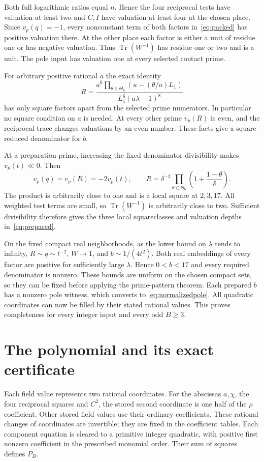 \documentclass[11pt,a4paper]{article}
\DeclareMathOperator{\Tr}{Tr}\DeclareMathOperator{\Nm}{N}
\begin{document}
Both full logarithmic ratios equal $n$. Hence the four reciprocal
tests have valuation at least two and $C,I$ have valuation at least
four at the chosen place. Since $v_p(q)=-1$, every nonconstant term
of both factors in~\eqref{eq:packed} has positive valuation there.
At the other place each factor is either a unit of residue one or has
negative valuation. Thus $\Tr(W^{-1})$ has residue one or two and is
a unit. The pole input has valuation one at every selected contact prime.

For arbitrary positive rational $a$ the exact identity
\begin{equation}\label{eq:primeproduct}
 R=\frac{a^6\prod_{\theta\in\Theta_6}(u-(\theta/a)L_1)}
             {L_1^6(a\lambda-1)^8}
\end{equation}
has only square factors apart from the selected prime numerators.
In particular no square condition on $a$ is needed. At every other
prime $v_p(R)$ is even, and the reciprocal trace changes valuations
by an even number. These facts give a square reduced denominator for $b$.

At a preparation prime, increasing the fixed denominator divisibility
makes $v_p(t)\ll0$. Then
\[
 v_p(q)=v_p(R)=-2v_p(t),\qquad
 R=\delta^{-2}\prod_{\theta\in\Theta_6}
                   \left(1+\frac{1-\theta}{\delta}\right).
\]
The product is arbitrarily close to one and is a local square at
$2,3,17$. All weighted test terms are small, so $\Tr(W^{-1})$ is
arbitrarily close to two. Sufficient divisibility therefore gives the
three local squareclasses and valuation depths in~\eqref{eq:prepared}.

On the fixed compact real neighborhoods, as the lower bound on $\lambda$
tends to infinity, $R\sim q\sim t^{-2}$, $W\to1$, and
$b\sim1/(4t^2)$. Both real embeddings of every factor are positive
for sufficiently large $\lambda$. Hence $0<b<17$ and every required
denominator is nonzero. These bounds are uniform on the chosen compact
sets, so they can be fixed before applying the prime-pattern theorem.
Each prepared $b$ has a nonzero pole witness, which converts to
\eqref{eq:normalizedpole}. All quadratic coordinates can now be filled
by their stated rational values. This proves completeness for every
integer input and every odd $B\ge3$.

\section{The polynomial and its exact certificate}

Each field value represents two rational coordinates. For the abscissas
$a,\chi$, the four reciprocal squares and $C^2$, the stored second
coordinate is one half of the $\rho$ coefficient. Other stored field
values use their ordinary coefficients. These rational changes of
coordinates are invertible; they are fixed in the coefficient tables.
Each component equation is cleared to a primitive integer quadratic,
with positive first nonzero coefficient in the prescribed monomial order.
Their sum of squares defines $P_B$.
\end{document}
